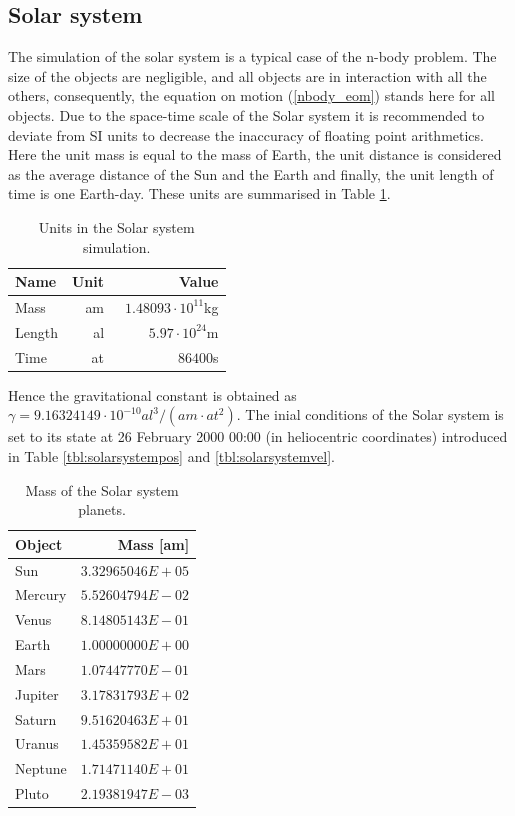 \documentclass[a4paper,12pt,openany]{book}
\newcommand{\equref}[1]{(\ref{#1})}
\theoremstyle{break}
\begin{document}
\subsection{Solar system}
The simulation of the solar system is a typical case of the n-body problem. The size of the objects are negligible, and all objects are in interaction with all the others, consequently, the equation on motion \equref{nbody_eom} stands here for all objects.
Due to the space-time scale of the Solar system it is recommended to deviate from SI units to decrease the inaccuracy of floating point arithmetics. Here the unit mass is equal to the mass of Earth, the unit distance is considered as the average distance of the Sun and the Earth and finally, the unit length of time is one Earth-day. These units are summarised in Table \ref{tbl:astronomical_units}.
\begin{table}
\begin{center}
\caption{Units in the Solar system simulation.}\label{tbl:astronomical_units}
\begin{tabular}{ l r r }
\toprule[1.5pt]
\bf Name & \bf Unit & \bf Value \\
\midrule
Mass & am & $1.48093\cdot 10^{11}$kg \\
Length & al & $5.97\cdot 10^{24}$m \\
Time & at & $86400$s \\
\bottomrule[1.25pt]
\end{tabular}
\end{center}
\end{table}
Hence the gravitational constant is obtained as $\gamma=9.16324149\cdot 10^{-10}al^3/(am\cdot at^2)$. The inial conditions of the Solar system is set to its state at 26 February 2000 00:00 (in heliocentric coordinates) introduced in Table \ref{tbl:solarsystempos} and \ref{tbl:solarsystemvel}. 
\begin{table}
\begin{center}
\caption{Mass of the Solar system planets.}\label{tbl:solarsystemmass}
\begin{tabular}{ l r }
\toprule[1.5pt]
\bf Object & \bf Mass [am] \\
\midrule
Sun & $3.32965046E+05$ \\
Mercury & $5.52604794E-02$ \\
Venus & $8.14805143E-01$ \\
Earth & $1.00000000E+00$ \\
Mars & $1.07447770E-01$ \\
Jupiter & $3.17831793E+02$ \\
Saturn & $9.51620463E+01$ \\
Uranus & $1.45359582E+01$ \\
Neptune & $1.71471140E+01$ \\
Pluto & $2.19381947E-03$ \\
\bottomrule[1.25pt]
\end{tabular}
\end{center}
\end{table}
\end{document}
